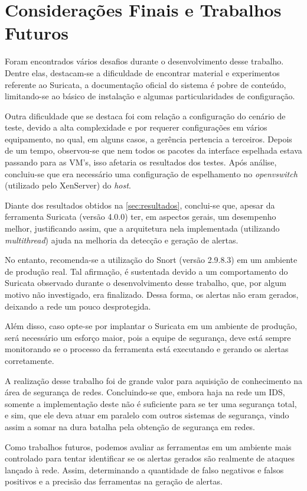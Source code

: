 \chapter{Considerações Finais e Trabalhos Futuros} \label{ch:considerações}

Foram encontrados vários desafios durante o desenvolvimento desse trabalho. Dentre elas, destacam-se a dificuldade de encontrar material e experimentos referente ao Suricata, a documentação oficial do sistema é pobre de conteúdo, limitando-se ao básico de instalação e algumas particularidades de configuração. 

Outra dificuldade que se destaca foi com relação a configuração do cenário de teste, devido a alta complexidade e por requerer configurações em vários equipamento, no qual, em alguns casos, a gerência pertencia a terceiros. Depois de um tempo, observou-se que nem todos os pacotes da interface espelhada estava passando para as VM's, isso afetaria os resultados dos testes. Após análise, concluiu-se que era necessário uma configuração de espelhamento no \textit{openvswitch} (utilizado pelo XenServer) do \textit{host}.

Diante dos resultados obtidos na \autoref{sec:resultados}, conclui-se que, apesar da ferramenta Suricata (versão 4.0.0) ter, em aspectos gerais, um desempenho melhor, justificando assim, que a arquitetura nela implementada (utilizando \textit{multithread}) ajuda na melhoria da detecção e geração de alertas. 

No entanto, recomenda-se a utilização do Snort (versão 2.9.8.3) em um ambiente de produção real. Tal afirmação, é sustentada devido a um comportamento do Suricata observado durante o desenvolvimento desse trabalho, que, por algum motivo não investigado, era finalizado. Dessa forma, os alertas não eram gerados, deixando a rede um pouco desprotegida.

Além disso, caso opte-se por implantar o Suricata em um ambiente de produção, será necessário um esforço maior, pois a equipe de segurança, deve está sempre monitorando se o processo da ferramenta está executando e gerando os alertas corretamente.

A realização desse trabalho foi de grande valor para aquisição de conhecimento na área de segurança de redes. Concluindo-se que, embora haja na rede um IDS, somente a implementação deste não é suficiente para se ter uma segurança total, e sim, que ele deva atuar em paralelo com outros sistemas de segurança, vindo assim a somar na dura batalha pela obtenção de segurança em redes. 

Como trabalhos futuros, podemos avaliar as ferramentas em um ambiente mais controlado para tentar identificar se os alertas gerados são realmente de ataques lançado à rede. Assim, determinando a quantidade de falso negativos e falsos positivos e a precisão das ferramentas na geração de alertas.
